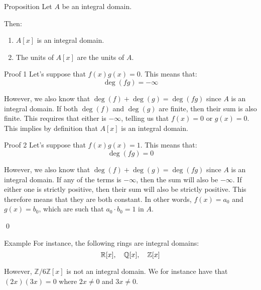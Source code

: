 \documentclass[a4paper]{article}
\begin{document}
\begin{parag}{Proposition}
    Let $A$ be an integral domain.

    Then:
    \begin{enumerate}
        \item $A\left[x\right]$ is an integral domain.
        \item The units of $A\left[x\right]$ are the units of $A$.
    \end{enumerate}

    \begin{subparag}{Proof 1}
        Let's suppose that $f\left(x\right)g\left(x\right) = 0$. This means that: 
        \[\deg\left(fg\right) = -\infty\]

        However, we also know that $\deg\left(f\right) + \deg\left(g\right) = \deg\left(fg\right)$ since $A$ is an integral domain. If both $\deg\left(f\right)$ and $\deg\left(g\right)$ are finite, then their sum is also finite. This requires that either is $-\infty$, telling us that $f\left(x\right) = 0$ or $g\left(x\right) = 0$. This implies by definition that $A\left[x\right]$ is an integral domain.
    \end{subparag}

    \begin{subparag}{Proof 2}
        Let's suppose that $f\left(x\right)g\left(x\right) = 1$. This means that: 
        \[\deg\left(fg\right) = 0\]
        
        However, we also know that $\deg\left(f\right) + \deg\left(g\right) = \deg\left(fg\right)$ since $A$ is an integral domain. If any of the terms is $-\infty$, then the sum will also be $-\infty$. If either one is strictly positive, then their sum will also be strictly positive. This therefore means that they are both constant. In other words, $f\left(x\right) = a_0$ and $g\left(x\right) = b_0$, which are such that $a_0 \cdot b_0 = 1$ in $A$.

        \qed
    \end{subparag}
\end{parag}

\begin{parag}{Example}
    For instance, the following rings are integral domains: 
    \[\mathbb{R}\left[x\right], \mathspace \mathbb{Q}\left[x\right], \mathspace \mathbb{Z}\left[x\right]\]
    
    However, $\mathbb{Z}/6\mathbb{Z}\left[x\right]$ is not an integral domain. We for instance have that $\left(2x\right)\left(3x\right) = 0$ where $2x \neq 0$ and $3x \neq 0$.
\end{parag}
\end{document}
